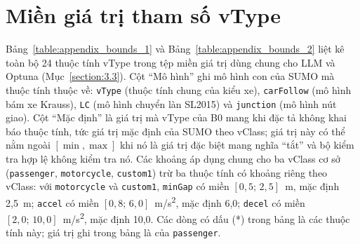 \documentclass[../DoAn.tex]{subfiles}
\begin{document}
\section{Miền giá trị tham số vType}
\label{section:appendix_bounds}

Bảng~\ref{table:appendix_bounds_1} và Bảng~\ref{table:appendix_bounds_2} liệt kê toàn bộ 24 thuộc tính vType trong tệp miền giá trị dùng chung cho LLM và Optuna (Mục~\ref{section:3.3}). Cột ``Mô hình'' ghi mô hình con của SUMO mà thuộc tính thuộc về: \texttt{vType} (thuộc tính chung của kiểu xe), \texttt{carFollow} (mô hình bám xe Krauss), \texttt{LC} (mô hình chuyển làn SL2015) và \texttt{junction} (mô hình nút giao). Cột ``Mặc định'' là giá trị mà vType của B0 mang khi đặc tả không khai báo thuộc tính, tức giá trị mặc định của SUMO theo vClass; giá trị này có thể nằm ngoài $[\min,\max]$ khi nó là giá trị đặc biệt mang nghĩa ``tắt'' và bộ kiểm tra hợp lệ không kiểm tra nó. Các khoảng áp dụng chung cho ba vClass cơ sở (\texttt{passenger}, \texttt{motorcycle}, \texttt{custom1}) trừ ba thuộc tính có khoảng riêng theo vClass: với \texttt{motorcycle} và \texttt{custom1}, \texttt{minGap} có miền $[0{,}5;\,2{,}5]$~m, mặc định 2,5~m; \texttt{accel} có miền $[0{,}8;\,6{,}0]$~m/s\textsuperscript{2}, mặc định 6,0; \texttt{decel} có miền $[2{,}0;\,10{,}0]$~m/s\textsuperscript{2}, mặc định 10,0. Các dòng có dấu (*) trong bảng là các thuộc tính này; giá trị ghi trong bảng là của \texttt{passenger}.
\end{document}
